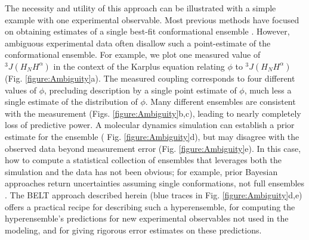 \documentclass[12pt]{article}
\begin{document}
The necessity and utility of this approach can be illustrated with a simple example with one experimental observable. Most previous methods have focused on obtaining estimates of a single best-fit conformational ensemble  \cite{rozycki2011saxs,  Graf2007, chodera2012}.  However, ambiguous experimental data often disallow such a point-estimate of the conformational ensemble.  For example, we plot one measured  \cite{Graf2007} value of $^3J(H_NH^\alpha)$ in the context of the Karplus \cite{vogeli2007limits} equation relating $\phi$ to $^3J(H_NH^\alpha)$ (Fig. \ref{figure:Ambiguity}a).  The measured coupling corresponds to four different values of $\phi$, precluding description by a single point estimate of $\phi$, much less a single estimate of the distribution of $\phi$. Many different ensembles are consistent with the measurement (Figs. \ref{figure:Ambiguity}b,c), leading to nearly completely loss of predictive power. A molecular dynamics simulation can establish a prior estimate for the ensemble 
( Fig. \ref{figure:Ambiguity}d),  but may disagree with the observed data beyond measurement error (Fig. \ref{figure:Ambiguity}e). In this case, how to compute a statistical collection of ensembles that leverages both the simulation and the data has not been obvious; for example, prior Bayesian approaches return uncertainties assuming single conformations, not full ensembles \cite{rieping2005}.  The BELT approach described herein (blue traces in Fig. \ref{figure:Ambiguity}d,e) offers a practical recipe for describing such a hyperensemble, for computing the hyperensemble's predictions for new experimental observables not used in the modeling, and for giving rigorous error estimates on these predictions.
\end{document}
